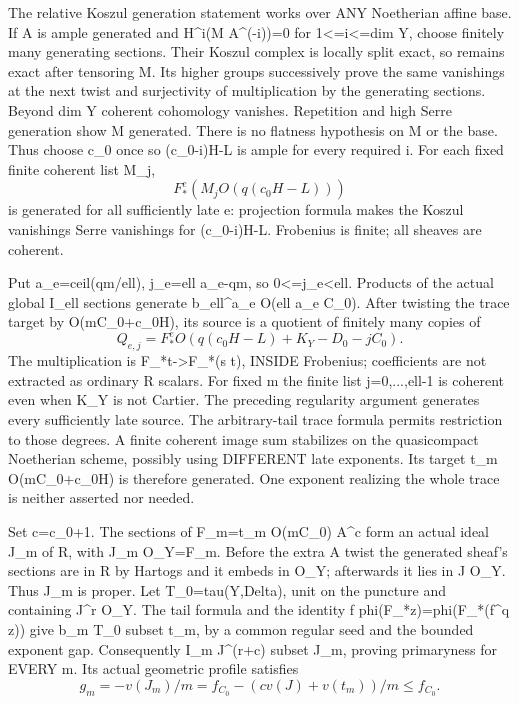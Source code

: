 \documentclass[11pt]{article}
\begin{document}
The relative Koszul generation statement works over ANY Noetherian affine base. If A is ample generated and H\textasciicircum{}i(M A\textasciicircum{}(-i))=0 for 1<=i<=dim Y, choose finitely many generating sections. Their Koszul complex is locally split exact, so remains exact after tensoring M. Its higher groups successively prove the same vanishings at the next twist and surjectivity of multiplication by the generating sections. Beyond dim Y coherent cohomology vanishes. Repetition and high Serre generation show M generated. There is no flatness hypothesis on M or the base. Thus choose c\_0 once so (c\_0-i)H-L is ample for every required i. For each fixed finite coherent list M\_j,
\[
F_*^e(M_j O(q(c_0H-L)))
\]
is generated for all sufficiently late e: projection formula makes the Koszul vanishings Serre vanishings for (c\_0-i)H-L. Frobenius is finite; all sheaves are coherent.

Put a\_e=ceil(qm/ell), j\_e=ell a\_e-qm, so 0<=j\_e<ell. Products of the actual global I\_ell sections generate b\_ell\textasciicircum{}a\_e O(ell a\_e C\_0). After twisting the trace target by O(mC\_0+c\_0H), its source is a quotient of finitely many copies of
\[
Q_{e,j}=F_*^e O(q(c_0H-L)+K_Y-D_0-jC_0).
\]
The multiplication is F\_*t->F\_*(s t), INSIDE Frobenius; coefficients are not extracted as ordinary R scalars. For fixed m the finite list j=0,...,ell-1 is coherent even when K\_Y is not Cartier. The preceding regularity argument generates every sufficiently late source. The arbitrary-tail trace formula permits restriction to those degrees. A finite coherent image sum stabilizes on the quasicompact Noetherian scheme, possibly using DIFFERENT late exponents. Its target t\_m O(mC\_0+c\_0H) is therefore generated. One exponent realizing the whole trace is neither asserted nor needed.

Set c=c\_0+1. The sections of F\_m=t\_m O(mC\_0) A\textasciicircum{}c form an actual ideal J\_m of R, with J\_m O\_Y=F\_m. Before the extra A twist the generated sheaf's sections are in R by Hartogs and it embeds in O\_Y; afterwards it lies in J O\_Y. Thus J\_m is proper. Let T\_0=tau(Y,Delta), unit on the puncture and containing J\textasciicircum{}r O\_Y. The tail formula and the identity f phi(F\_*z)=phi(F\_*(f\textasciicircum{}q z)) give b\_m T\_0 subset t\_m, by a common regular seed and the bounded exponent gap. Consequently I\_m J\textasciicircum{}(r+c) subset J\_m, proving primaryness for EVERY m. Its actual geometric profile satisfies
\[
g_m=-v(J_m)/m=f_{C_0}-(c v(J)+v(t_m))/m\le f_{C_0}.
\]
\end{document}

